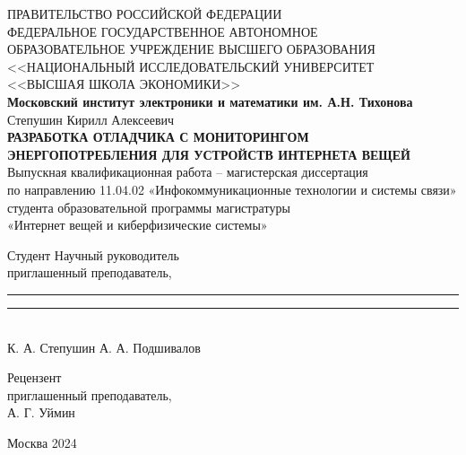 \begin{titlepage}
    \newpage
    
    \begin{center}
    ПРАВИТЕЛЬСТВО РОССИЙСКОЙ ФЕДЕРАЦИИ \\
    \vspace{1em}
    ФЕДЕРАЛЬНОЕ  ГОСУДАРСТВЕННОЕ АВТОНОМНОЕ \\
    ОБРАЗОВАТЕЛЬНОЕ УЧРЕЖДЕНИЕ ВЫСШЕГО ОБРАЗОВАНИЯ \\
    <<НАЦИОНАЛЬНЫЙ ИССЛЕДОВАТЕЛЬСКИЙ УНИВЕРСИТЕТ \\
    <<ВЫСШАЯ ШКОЛА ЭКОНОМИКИ>> \\
    \vspace{2em}
    \textbf{Московский институт электроники и математики им. А.Н. Тихонова}\\
    \vspace{6em}
    Степушин Кирилл Алексеевич\\
    \vspace{3em}
    \textbf{РАЗРАБОТКА ОТЛАДЧИКА С МОНИТОРИНГОМ ЭНЕРГОПОТРЕБЛЕНИЯ ДЛЯ УСТРОЙСТВ ИНТЕРНЕТА ВЕЩЕЙ}\\
    \vspace{6em}
    Выпускная квалификационная работа -- магистерская диссертация\\ 
    по направлению 11.04.02 «Инфокоммуникационные технологии и системы связи»\\
    студента образовательной программы магистратуры\\
    «Интернет вещей и киберфизические системы»
    \end{center}

    \vspace{6em}

    \begin{flushleft}
    Студент \hfill Научный руководитель\\
    \hfill приглашенный преподаватель,\\
    \vspace{1em}
    \rule{5cm}{0.005cm} \hfill \rule{5cm}{0.01cm}\\
    К. А. Степушин \hfill А. А. Подшивалов

    \vspace{1em}

    Рецензент \hfill \\
    приглашенный преподаватель, \hfill \\
    А. Г. Уймин 
    \end{flushleft}
    
    \vspace{\fill}
    
    \begin{center}
    Москва 2024
    \end{center}
    
    \end{titlepage}